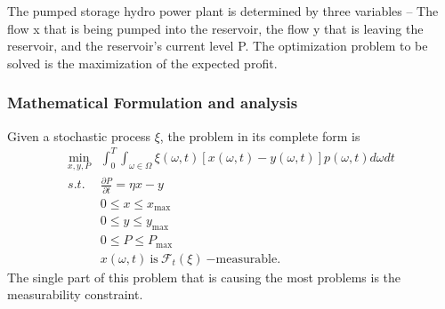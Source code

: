 \documentclass[a4paper, 12pt] {article}
\begin{document}
The pumped storage hydro power plant is determined by three variables – The flow x that is being pumped into the reservoir, the flow y that is leaving the reservoir, and the reservoir's current level P.  The optimization problem to be solved is the maximization of the expected profit. 
\subsubsection{Mathematical Formulation and analysis}
Given a stochastic process $\xi$, the problem in its complete form is
\begin{equation}
\begin{array}{cc}
\displaystyle \min_{x,y,P} &\displaystyle\int_0^T \int_{\omega \in\Omega}\xi(\omega,t)\left[x(\omega,t)-y(\omega,t)\right]p(\omega,t)d\omega dt\\
s.t.& \displaystyle\frac{\partial P}{\partial t} = \eta x -y\\
&0\leq x \leq x_{\mathrm{max}}\\
&0\leq y \leq y_{\mathrm{max}}\\
&0\leq P \leq P_{\mathrm{max}}\\
&\displaystyle x(\omega, t)\:\mathrm{ is }\:\mathcal{F}_t(\xi)\:\mathrm{ - measurable.}
\end{array}
\end{equation}
The single part of this problem that is causing the most problems is the measurability constraint. 
\newpage


\end{document}
